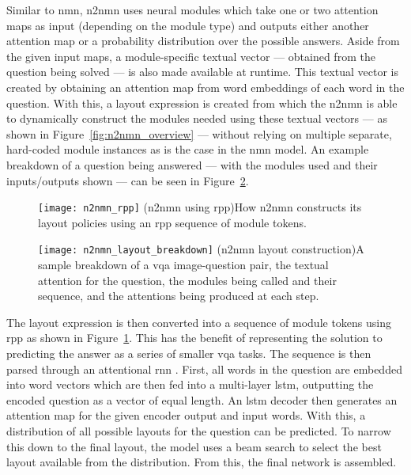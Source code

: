 Similar to \acrshort{nmn}, \acrshort{n2nmn} uses neural modules which take one or two attention maps as input (depending on the module type) and outputs either another attention map or a probability distribution over the possible answers.
Aside from the given input maps, a module-specific textual vector --- obtained from the question being solved --- is also made available at runtime.
This textual vector is created by obtaining an attention map from word embeddings of each word in the question.
With this, a layout expression is created from which the \acrshort{n2nmn} is able to dynamically construct the modules needed using these textual vectors — as shown in Figure~\ref{fig:n2nmn_overview} — without relying on multiple separate, hard-coded module instances as is the case in the \acrshort{nmn} model.
An example breakdown of a question being answered --- with the modules used and their inputs/outputs shown --- can be seen in Figure~\ref{fig:n2nmn_layout_breakdown}.

\begin{figure}[htbp]
    \centering
    \texttt{[image: n2nmn\_rpp]}
    \captionsource(\acrshort{n2nmn} using \acrshort{rpp}){How \acrshort{n2nmn} constructs its layout policies using an \acrshort{rpp} sequence of module tokens. \label{fig:n2nmn_rpp}}{\citeauthor{hu_learning_2017}\cite{hu_learning_2017}}
\end{figure}

\begin{figure}[htbp]
    \centering
    \texttt{[image: n2nmn\_layout\_breakdown]}
    \captionsource(\acrshort{n2nmn} layout construction){A sample breakdown of a \acrshort{vqa} image-question pair, the textual attention for the question, the modules being called and their sequence, and the attentions being produced at each step.\label{fig:n2nmn_layout_breakdown}}{\citeauthor{hu_learning_2017}\cite{hu_learning_2017}}
\end{figure}

The layout expression is then converted into a sequence of module tokens using \acrlong{rpp} as shown in Figure~\ref{fig:n2nmn_rpp}. This has the benefit of representing the solution to predicting the answer as a series of smaller \acrshort{vqa} tasks.
The sequence is then parsed through an attentional \gls{rnn} \cite{bahdanau_neural_2016}. First, all words in the question are embedded into word vectors which are then fed into a multi-layer \gls{lstm}, outputting the encoded question as a vector of equal length.
An \acrshort{lstm} decoder then generates an attention map for the given encoder output and input words.
With this, a distribution of all possible layouts for the question can be predicted.
To narrow this down to the final layout, the model uses a beam search to select the best layout available from the distribution. From this, the final network is assembled.

